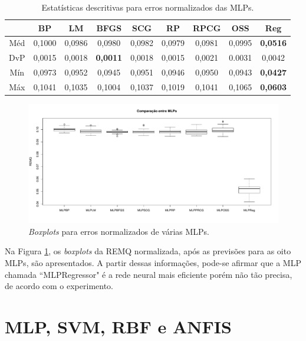 \begin{table}[h]
\caption{Estatísticas descritivas para erros normalizados das MLPs.}\label{tab:mlps_descriptive} \centering
\begin{tabular}{|c|c|c|c|c|c|c|c|c|}
  \hline
   & BP & LM & BFGS & SCG & RP & RPCG & OSS & Reg \\
  \hline
  Méd & 0,1000 & 0,0986 & 0,0980 & 0,0982 & 0,0979 & 0,0981 & 0,0995 & \textbf{0,0516}   \\
  \hline
  DvP & 0,0015 & 0,0018 & \textbf{0,0011} & 0,0018 & 0,0015 & 0,0021 & 0.0031 & 0,0042   \\
  \hline
  Mín & 0,0973 & 0,0952 & 0,0945 & 0,0951 & 0,0946 & 0,0950 & 0,0943 & \textbf{0,0427}   \\
  \hline
  Máx & 0,1041 & 0,1035 & 0,1004 & 0,1037 & 0,1019 & 0,1041 & 0,1065 & \textbf{0,0603}   \\
  \hline
\end{tabular}
\end{table}

\begin{figure}[h]
  \vspace{-0.2cm}
  \centering
  \includegraphics[trim = 1mm 10mm 1mm 1mm,clip,width=\columnwidth]{image/mlps_ex3.pdf}
  \caption{\textit{Boxplots} para erros normalizados de várias MLPs.}
  \label{fig:mlps_result}
\end{figure}

Na Figura \ref{fig:mlps_result}, os \textit{boxplots} da REMQ normalizada, após as previsões para as oito MLPs, são apresentados. A partir dessas informações, pode-se afirmar que a MLP chamada ``MLPRegressor" é a rede neural mais eficiente porém não tão precisa, de acordo com o experimento.

\section{MLP, SVM, RBF e ANFIS}

